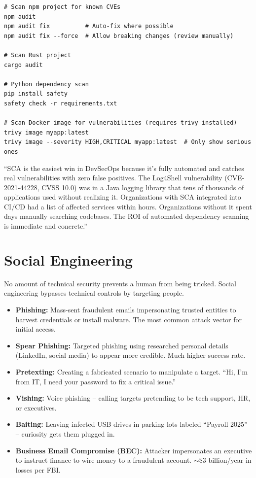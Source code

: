 \documentclass[11pt, letterpaper]{article}
\newcommand{\talkingpoint}[1]{%
  \begin{tcolorbox}[colback=talkbg, colframe=talkborder,
    title={\bfseries Interview Talking Point}, arc=3pt, boxrule=1pt]
  #1
  \end{tcolorbox}%
}
\begin{document}
\begin{lstlisting}[style=shell, caption={Quick security scans from the command line}]
# Scan npm project for known CVEs
npm audit
npm audit fix          # Auto-fix where possible
npm audit fix --force  # Allow breaking changes (review manually)

# Scan Rust project
cargo audit

# Python dependency scan
pip install safety
safety check -r requirements.txt

# Scan Docker image for vulnerabilities (requires trivy installed)
trivy image myapp:latest
trivy image --severity HIGH,CRITICAL myapp:latest  # Only show serious ones
\end{lstlisting}

\talkingpoint{``SCA is the easiest win in DevSecOps because it's fully automated and catches real vulnerabilities with zero false positives. The Log4Shell vulnerability (CVE-2021-44228, CVSS 10.0) was in a Java logging library that tens of thousands of applications used without realizing it. Organizations with SCA integrated into CI/CD had a list of affected services within hours. Organizations without it spent days manually searching codebases. The ROI of automated dependency scanning is immediate and concrete.''}

\section*{Social Engineering}

No amount of technical security prevents a human from being tricked. Social engineering bypasses technical controls by targeting people.

\begin{itemize}[noitemsep]
  \item \textbf{Phishing:} Mass-sent fraudulent emails impersonating trusted entities to harvest credentials or install malware. The most common attack vector for initial access.
  \item \textbf{Spear Phishing:} Targeted phishing using researched personal details (LinkedIn, social media) to appear more credible. Much higher success rate.
  \item \textbf{Pretexting:} Creating a fabricated scenario to manipulate a target. ``Hi, I'm from IT, I need your password to fix a critical issue.''
  \item \textbf{Vishing:} Voice phishing -- calling targets pretending to be tech support, HR, or executives.
  \item \textbf{Baiting:} Leaving infected USB drives in parking lots labeled ``Payroll 2025'' -- curiosity gets them plugged in.
  \item \textbf{Business Email Compromise (BEC):} Attacker impersonates an executive to instruct finance to wire money to a fraudulent account. $\sim$\$3 billion/year in losses per FBI.
\end{itemize}
\end{document}
